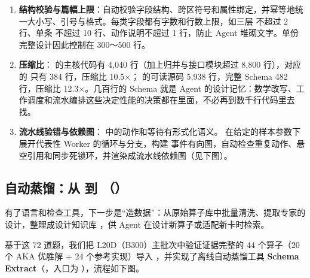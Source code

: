 \begin{enumerate}[start=1]
\item
\textbf{结构校验与篇幅上限}：自动校验字段结构、跨区符号和属性绑定，并幂等地统一大小写、引号与格式。每类字段都有字数和行数上限，如三层  不超过 2 行、单条  不超过 10 行、动作说明不超过 1 行，防止 Agent 堆砌文字。单份完整设计因此控制在 300～500 行。


\item
\textbf{压缩比}： 的主核代码有 4,040 行（加上归并与接口模块超过 8,800 行），对应的  只有 384 行，压缩比 10.5×； 的可读源码 5,938 行，完整 Schema 482 行，压缩比 12.3×。几百行的 Schema 就是 Agent 的设计记忆：数学改写、工作调度和流水编排这些决定性能的决策都在里面，不必再到数千行代码里去找。


\item
\textbf{流水线验错与依赖图}： 中的动作和等待有形式化语义。 在给定的样本参数下展开代表性 Worker 的循环与分支，构建  事件有向图，自动检查重复动作、悬空引用和同步死锁环，并渲染成流水线依赖图（见下图）。


\end{enumerate}


\newpage

\subsection{自动蒸馏：从  到 （）}\label{sec:schema-extract}
有了语言和检查工具，下一步是“造数据”：从原始算子库中批量清洗、提取专家的设计，整理成设计知识库 ，供 Agent 在设计新算子或适配新卡时检索。


基于这 72 道题，我们把 L20D（B300）主批次中验证证据完整的 44 个算子（20 个 AKA 优胜解 + 24 个参考实现）导入 ，并实现了离线自动蒸馏工具 \textbf{Schema Extract}（，入口为 ），流程如下图。



